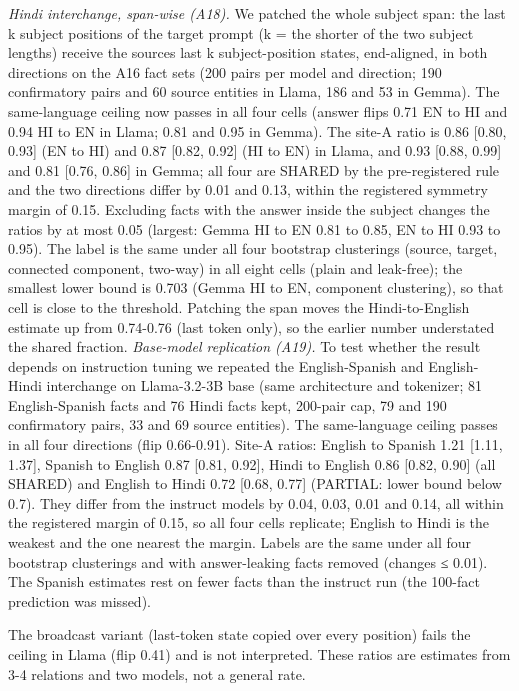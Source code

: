 \documentclass[11pt]{article}
\begin{document}
\emph{Hindi interchange, span-wise (A18).} We patched the whole subject span: the last k subject positions of the target prompt (k = the shorter of the two subject lengths) receive the source\textquotesingle s last k subject-position states, end-aligned, in both directions on the A16 fact sets (200 pairs per model and direction; 190 confirmatory pairs and 60 source entities in Llama, 186 and 53 in Gemma). The same-language ceiling now passes in all four cells (answer flips 0.71 EN to HI and 0.94 HI to EN in Llama; 0.81 and 0.95 in Gemma). The site-A ratio is 0.86 {[}0.80, 0.93{]} (EN to HI) and 0.87 {[}0.82, 0.92{]} (HI to EN) in Llama, and 0.93 {[}0.88, 0.99{]} and 0.81 {[}0.76, 0.86{]} in Gemma; all four are SHARED by the pre-registered rule and the two directions differ by 0.01 and 0.13, within the registered symmetry margin of 0.15. Excluding facts with the answer inside the subject changes the ratios by at most 0.05 (largest: Gemma HI to EN 0.81 to 0.85, EN to HI 0.93 to 0.95). The label is the same under all four bootstrap clusterings (source, target, connected component, two-way) in all eight cells (plain and leak-free); the smallest lower bound is 0.703 (Gemma HI to EN, component clustering), so that cell is close to the threshold. Patching the span moves the Hindi-to-English estimate up from 0.74-0.76 (last token only), so the earlier number understated the shared fraction. \emph{Base-model replication (A19).} To test whether the result depends on instruction tuning we repeated the English-Spanish and English-Hindi interchange on Llama-3.2-3B base (same architecture and tokenizer; 81 English-Spanish facts and 76 Hindi facts kept, 200-pair cap, 79 and 190 confirmatory pairs, 33 and 69 source entities). The same-language ceiling passes in all four directions (flip 0.66-0.91). Site-A ratios: English to Spanish 1.21 {[}1.11, 1.37{]}, Spanish to English 0.87 {[}0.81, 0.92{]}, Hindi to English 0.86 {[}0.82, 0.90{]} (all SHARED) and English to Hindi 0.72 {[}0.68, 0.77{]} (PARTIAL: lower bound below 0.7). They differ from the instruct model\textquotesingle s by 0.04, 0.03, 0.01 and 0.14, all within the registered margin of 0.15, so all four cells replicate; English to Hindi is the weakest and the one nearest the margin. Labels are the same under all four bootstrap clusterings and with answer-leaking facts removed (changes ≤ 0.01). The Spanish estimates rest on fewer facts than the instruct run (the 100-fact prediction was missed).

The broadcast variant (last-token state copied over every position) fails the ceiling in Llama (flip 0.41) and is not interpreted. These ratios are estimates from 3-4 relations and two models, not a general rate.
\end{document}
